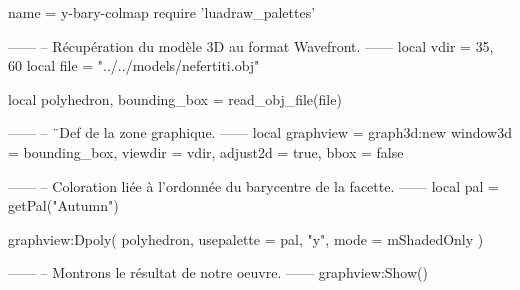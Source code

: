 \documentclass[border = 3pt]{standalone}
\begin{document}
\begin{luadraw*}{name = y-bary-colmap}
require 'luadraw_palettes'

------
-- Récupération du modèle 3D au format Wavefront.
------
local vdir = {35, 60}
local file = "../../models/nefertiti.obj"

local polyhedron, bounding_box = read_obj_file(file)

------
-- ¨Def de la zone graphique.
------
local graphview = graph3d:new{
  window3d = bounding_box,
  viewdir  = vdir,
  adjust2d = true,
  bbox     = false
}

------
-- Coloration liée à l'ordonnée du barycentre de la facette.
------
local pal = getPal("Autumn")

graphview:Dpoly(
  polyhedron,
  {
    usepalette = {pal, "y"},
    mode       = mShadedOnly
  }
)

------
-- Montrons le résultat de notre oeuvre.
------
graphview:Show()
\end{luadraw*}
\end{document}
